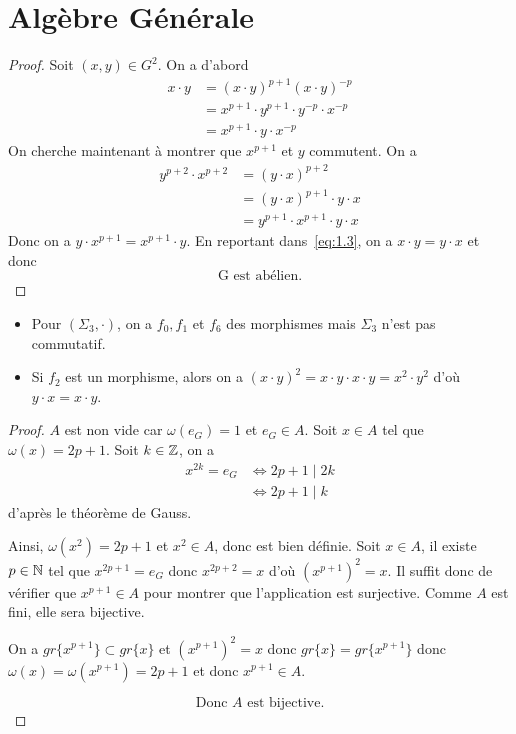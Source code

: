 \section{Algèbre Générale}

\begin{proof}
	Soit $(x,y)\in G^{2}$. On a d'abord
	\begin{align}
		x\cdot y
		&=(x\cdot y)^{p+1}(x\cdot y)^{-p}\\
		&=x^{p+1}\cdot y^{p+1}\cdot y^{-p}\cdot x^{-p}\\
		&=x^{p+1}\cdot y \cdot x^{-p} \label{eq:1.3}
	\end{align}
	On cherche maintenant à montrer que $x^{p+1}$ et $y$ commutent.
	On a
	\begin{align}
		y^{p+2}\cdot x^{p+2}
		&=(y\cdot x)^{p+2}\\
		&=(y\cdot x)^{p+1}\cdot y\cdot x\\
		&=y^{p+1}\cdot x^{p+1}\cdot y\cdot x
	\end{align}
	Donc on a $y\cdot x^{p+1}=x^{p+1}\cdot y$. En reportant dans~\eqref{eq:1.3}, on a $x\cdot y=y\cdot x$ et donc 
	\begin{equation}
		\boxed{\text{G est abélien.}}
	\end{equation}
\end{proof}

\begin{remark}
	\phantom{}
	\begin{itemize}
		\item Pour $(\Sigma_{3},\cdot)$, on a $f_{0},f_{1}$ et $f_{6}$ des morphismes mais $\Sigma_{3}$ n'est pas commutatif.
		\item Si $f_{2}$ est un morphisme, alors on a $(x\cdot y)^{2}=x\cdot y\cdot x\cdot y=x^{2}\cdot y^{2}$ d'où $y\cdot x=x\cdot y$.
	\end{itemize}
\end{remark}

\begin{proof}
	$A$ est non vide car $\omega(e_{G})=1$ et $e_{G}\in A$. Soit $x\in A$ tel que $\omega(x)=2p+1$. Soit $k\in\mathbb{Z}$, on a 
	\begin{align}
		x^{2k}=e_{G}
		&\Leftrightarrow 2p+1\mid 2k\\
		&\Leftrightarrow 2p+1\mid k
	\end{align}
	d'après le théorème de Gauss.

	Ainsi, $\omega(x^{2})=2p+1$ et $x^{2}\in A$, donc  est bien définie. Soit $x\in A$, il existe $p\in\mathbb{N}$ tel que $x^{2p+1}=e_{G}$ donc $x^{2p+2}=x$ d'où $(x^{p+1})^{2}=x$. Il suffit donc de vérifier que $x^{p+1}\in A$ pour montrer que l'application est surjective. Comme $A$ est fini, elle sera bijective.

	On a $gr\{x^{p+1}\}\subset gr\{x\}$ et $(x^{p+1})^{2}=x$ donc $gr\{x\}=gr\{x^{p+1}\}$ donc $\omega(x)=\omega(x^{p+1})=2p+1$ et donc $x^{p+1}\in A$.

	\begin{equation}
		\boxed{\text{Donc }A\text{ est bijective.}}
	\end{equation}
\end{proof}

